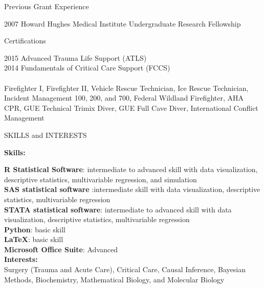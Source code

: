 \documentclass{resume} %
\begin{document}
 
   
   \begin{rSection}{Previous Grant Experience}
  
   2007 \enspace Howard Hughes Medical Institute Undergraduate Research Fellowship 
   
   
   \end{rSection}
   
   
   \begin{rSection}{Certifications}
  
   2015 \enspace Advanced Trauma Life Support (ATLS)\\
   2014 \enspace Fundamentals of Critical Care Support (FCCS) \\
   \\
   Firefighter I, Firefighter II, Vehicle Rescue Technician, Ice Rescue Technician, 
   Incident Management 100, 200, and 700, Federal Wildland Firefighter, AHA CPR,
   GUE Technical Trimix Diver, GUE Full Cave Diver, International Conflict Management
   
   
   \end{rSection}
   

\begin{rSection}{SKILLS and
INTERESTS}

\textbf{Skills:}
\vspace{0.25pt}

\space \textbf{R Statistical Software}: intermediate to advanced skill with data visualization,
descriptive statistics, multivariable regression, and simulation\\
\space\textbf{SAS statistical software} :intermediate skill with data visualization, descriptive statistics,
multivariable regression\\
\space \textbf{STATA statistical software}: intermediate to advanced skill with data visualization, descriptive statistics, multivariable regression\\
\space \textbf{Python}: basic skill\\
\space \textbf{\LaTeX}: basic skill\\ 
\space \textbf{Microsoft Office Suite}: Advanced\\

\textbf{Interests:} \\
Surgery (Trauma and Acute Care), Critical Care, Causal Inference, Bayesian Methods, Biochemistry, Mathematical Biology, and Molecular Biology 

\end{rSection}
\end{document}
